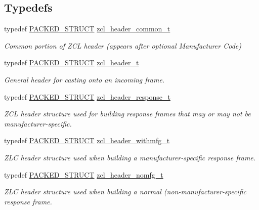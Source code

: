 \subsection*{Typedefs}
\begin{DoxyCompactItemize}
\item 
typedef \hyperlink{group___s_x_a_ga4233297bd31be5c273d4fb0758cc54d7}{P\+A\+C\+K\+E\+D\+\_\+\+S\+T\+R\+U\+CT} \hyperlink{group__zcl_gaece1b64b04ac629f83358d6d815451a5}{zcl\+\_\+header\+\_\+common\+\_\+t}
\begin{DoxyCompactList}\small\item\em Common portion of Z\+CL header (appears after optional Manufacturer Code) \end{DoxyCompactList}\item 
typedef \hyperlink{group___s_x_a_ga4233297bd31be5c273d4fb0758cc54d7}{P\+A\+C\+K\+E\+D\+\_\+\+S\+T\+R\+U\+CT} \hyperlink{group__zcl_gafc361d46dded7f1761048d78e3d4e18d}{zcl\+\_\+header\+\_\+t}
\begin{DoxyCompactList}\small\item\em General header for casting onto an incoming frame. \end{DoxyCompactList}\item 
typedef \hyperlink{group___s_x_a_ga4233297bd31be5c273d4fb0758cc54d7}{P\+A\+C\+K\+E\+D\+\_\+\+S\+T\+R\+U\+CT} \hyperlink{group__zcl_gaeac1f6671916dd0ad92b271080ec272a}{zcl\+\_\+header\+\_\+response\+\_\+t}
\begin{DoxyCompactList}\small\item\em Z\+CL header structure used for building response frames that may or may not be manufacturer-\/specific. \end{DoxyCompactList}\item 
typedef \hyperlink{group___s_x_a_ga4233297bd31be5c273d4fb0758cc54d7}{P\+A\+C\+K\+E\+D\+\_\+\+S\+T\+R\+U\+CT} \hyperlink{group__zcl_gac376225f8ee77006b884a222a9ac25cc}{zcl\+\_\+header\+\_\+withmfg\+\_\+t}
\begin{DoxyCompactList}\small\item\em Z\+LC header structure used when building a manufacturer-\/specific response frame. \end{DoxyCompactList}\item 
typedef \hyperlink{group___s_x_a_ga4233297bd31be5c273d4fb0758cc54d7}{P\+A\+C\+K\+E\+D\+\_\+\+S\+T\+R\+U\+CT} \hyperlink{group__zcl_gae988eb59c8a2e75b6cb34aefeca315d1}{zcl\+\_\+header\+\_\+nomfg\+\_\+t}
\begin{DoxyCompactList}\small\item\em Z\+LC header structure used when building a normal (non-\/manufacturer-\/specific response frame. \end{DoxyCompactList}\item 

\end{DoxyCompactItemize}

